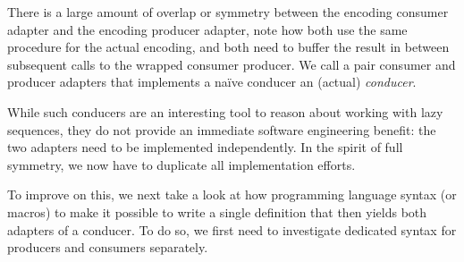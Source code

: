 \documentclass[sigplan,screen,10pt,anonymous,review]{acmart}
\begin{document}
There is a large amount of overlap or symmetry between the encoding consumer adapter and the encoding producer adapter, note how both use the same procedure for the actual encoding, and both need to buffer the result in between subsequent calls to the wrapped consumer producer. We call a pair consumer and producer adapters that implements a naïve conducer an (actual) \textit{conducer}.

While such conducers are an interesting tool to reason about working with lazy sequences, they do not provide an immediate software engineering benefit: the two adapters need to be implemented independently. In the spirit of full symmetry, we now have to duplicate all implementation efforts.

To improve on this, we next take a look at how programming language syntax (or macros) to make it possible to write a single definition that then yields both adapters of a conducer. To do so, we first need to investigate dedicated syntax for producers and consumers separately.




\end{document}
